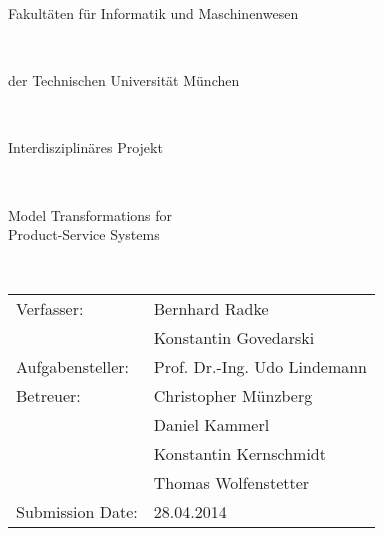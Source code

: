 \frontmatter
\pagestyle{empty}

\begin{titlepage}
\begin{center}
\begin{huge}
Fakult\"aten f\"ur Informatik und Maschinenwesen
\end{huge}\\
\vspace{4mm}
\begin{Large}
der Technischen Universit\"at M\"unchen
\end{Large}\\
\vspace{2.5cm}
\begin{Large}
Interdisziplin\"ares Projekt
\vspace{2.75cm}
\end{Large}\\
\begin{huge}
Model Transformations for\\\vspace{5mm} Product-Service Systems
\end{huge}\\
\vspace{1.25cm}
\begin{large}
\begin{tabular}{ll}
\vspace{0.1in}
Verfasser:& Bernhard Radke\\
\vspace{0.2in}
& Konstantin Govedarski\\
\vspace{0.2in}
Aufgabensteller:&Prof. Dr.-Ing. Udo Lindemann\\
\vspace{0.1in}
Betreuer: &Christopher M\"unzberg\\	
\vspace{0.1in}
&Daniel Kammerl\\
\vspace{0.1in}
&Konstantin Kernschmidt\\
\vspace{0.2in}
&Thomas Wolfenstetter\\
Submission Date:&28.04.2014\end{tabular}
\end{large}
\end{center}


\end{titlepage}
